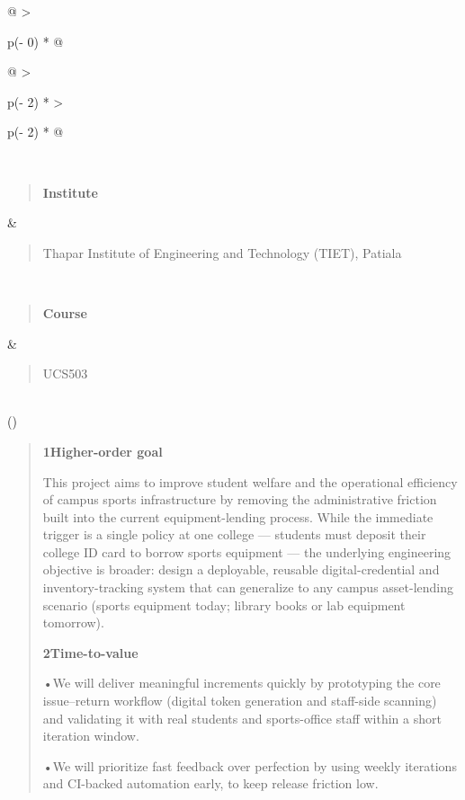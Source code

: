 \documentclass[
]{article}
\begin{document}
\begin{longtable}[]{@{}
  >{\raggedright\arraybackslash}p{(\columnwidth - 0\tabcolsep) * }@{}}
\begin{minipage}[b]{\linewidth}
\begin{longtable}[]{@{}
  >{\raggedright\arraybackslash}p{(\columnwidth - 2\tabcolsep) * }
  >{\raggedright\arraybackslash}p{(\columnwidth - 2\tabcolsep) * }@{}}
\begin{minipage}[t]{\linewidth}
\begin{quote}
\end{quote}
\end{minipage} \\
\begin{minipage}[t]{\linewidth}\raggedright
\begin{quote}
\textbf{Institute}
\end{quote}
\end{minipage} & \begin{minipage}[t]{\linewidth}\raggedright
\begin{quote}
Thapar Institute of Engineering and Technology (TIET), Patiala
\end{quote}
\end{minipage} \\
\begin{minipage}[t]{\linewidth}\raggedright
\begin{quote}
\textbf{Course}
\end{quote}
\end{minipage} & \begin{minipage}[t]{\linewidth}\raggedright
\begin{quote}
UCS503
\end{quote}
\end{minipage} \\
\bottomrule()
\end{longtable}

\begin{quote}
\textbf{1Higher-order goal}

This project aims to improve student welfare and the operational
efficiency of campus sports infrastructure by removing the
administrative friction built into the current equipment-lending
process. While the immediate trigger is a single policy at one college
--- students must deposit their college ID card to borrow sports
equipment --- the underlying engineering objective is broader: design a
deployable, reusable digital-credential and inventory-tracking system
that can generalize to any campus asset-lending scenario (sports
equipment today; library books or lab equipment tomorrow).

\textbf{2Time-to-value}

•We will deliver meaningful increments quickly by prototyping the core
issue--return workflow (digital token generation and staff-side
scanning) and validating it with real students and sports-office staff
within a short iteration window.

•We will prioritize fast feedback over perfection by using weekly
iterations and CI-backed automation early, to keep release friction low.


\end{quote}
\end{minipage}
\end{longtable}
\end{document}
